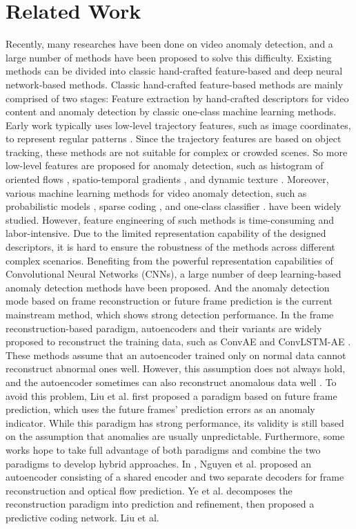 \documentclass[sigconf]{acmart}
\begin{document}
\section{Related Work}
Recently, many researches have been done on video anomaly detection, and a large number of methods have been proposed to solve this difficulty. Existing methods can be divided into classic hand-crafted feature-based and deep neural network-based methods. Classic hand-crafted feature-based methods are mainly comprised of two stages: Feature extraction by hand-crafted descriptors for video content and anomaly detection by classic one-class machine learning methods. Early work typically uses low-level trajectory features, such as image coordinates, to represent regular patterns \cite{tung2011goal, wu2010chaotic}. Since the trajectory features are based on object tracking, these methods are not suitable for complex or crowded scenes. So more low-level features are proposed for anomaly detection, such as histogram of oriented flows \cite{cong2011sparse}, spatio-temporal gradients \cite{lu2013abnormal, kratz2009anomaly}, and dynamic texture \cite{mahadevan2010anomaly}. Moreover, various machine learning methods for video anomaly detection, such as probabilistic models \cite{kim2009observe, mahadevan2010anomaly}, sparse coding \cite{cong2011sparse, lu2013abnormal}, and one-class classifier \cite{yin2008sensor}. have been widely studied. However, feature engineering of such methods is time-consuming and labor-intensive. Due to the limited representation capability of the designed descriptors, it is hard to ensure the robustness of the methods across different complex scenarios. Benefiting from the powerful representation capabilities of Convolutional Neural Networks (CNNs), a large number of deep learning-based anomaly detection methods have been proposed. And the anomaly detection mode based on frame reconstruction or future frame prediction is the current mainstream method, which shows strong detection performance. In the frame reconstruction-based paradigm, autoencoders and their variants are widely proposed to reconstruct the training data, such as ConvAE \cite{hasan2016learning} and ConvLSTM-AE \cite{luo2017remembering}. These methods assume that an autoencoder trained only on normal data cannot reconstruct abnormal ones well. However, this assumption does not always hold, and the autoencoder sometimes can also reconstruct anomalous data well \cite{gong2019memorizing, zaheer2020old}. To avoid this problem, Liu et al. \cite{liu2018future} first proposed a paradigm based on future frame prediction, which uses the future frames’ prediction errors as an anomaly indicator. While this paradigm has strong performance, its validity is still based on the assumption that anomalies are usually unpredictable. Furthermore, some works hope to take full advantage of both paradigms and combine the two paradigms to develop hybrid approaches. In \cite{nguyen2019anomaly}, Nguyen et al. proposed an autoencoder consisting of a shared encoder and two separate decoders for frame reconstruction and optical flow prediction. Ye et al. \cite{ye2019anopcn} decomposes the reconstruction paradigm into prediction and refinement, then proposed a predictive coding network. Liu et al. 
\end{document}
